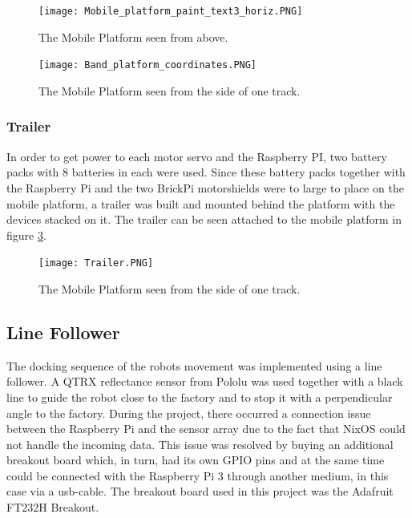 \begin{figure}[H]
    \centering
    \texttt{[image: Mobile\_platform\_paint\_text3\_horiz.PNG]}
    \caption{The Mobile Platform seen from above.}
    \label{Mobile_platform_paint_}
\end{figure}


\begin{figure}[H]
    \centering
    \texttt{[image: Band\_platform\_coordinates.PNG]}
    \caption{The Mobile Platform seen from the side of one track.}
    \label{Band_platform_coordinates}
\end{figure}

\subsubsection{Trailer}
In order to get power to each motor servo and the Raspberry PI, two battery packs with 8 batteries in each were used. Since these battery packs together with the Raspberry Pi and the two BrickPi motorshields were to large to place on the mobile platform, a trailer was built and mounted behind the platform with the devices stacked on it. The trailer can be seen attached to the mobile platform in figure \ref{Trailer}.

\begin{figure}[H]
    \centering
    \texttt{[image: Trailer.PNG]}
    \caption{The Mobile Platform seen from the side of one track.}
    \label{Trailer}
\end{figure}

\subsection{Line Follower}

The docking sequence of the robots movement was implemented using a line follower. A QTRX reflectance sensor from Pololu was used together with a black line to guide the robot close to the factory and to stop it with a perpendicular angle to the factory. During the project, there occurred a connection issue between the Raspberry Pi and the sensor array due to the fact that  NixOS could not handle the incoming data. This issue was resolved by buying an additional breakout board which, in turn, had its own GPIO pins and at the same time could be connected with the Raspberry Pi 3 through another medium, in this case via a usb-cable. The breakout board used in this project was the Adafruit FT232H Breakout.


